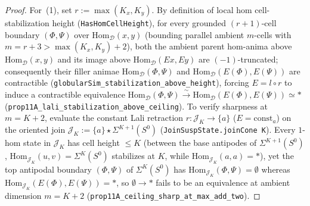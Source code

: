 \documentclass[10pt,twoside,openright]{book}
\theoremstyle{crmplain}
\theoremstyle{crmdef}
\theoremstyle{crmremark}
\begin{document}
\begin{proof}
For~(1), set $r := \max(K_x, K_y)$. By definition of local hom cell-stabilization height (\texttt{HasHomCellHeight}), for every grounded $(r+1)$-cell boundary $(\Phi, \Psi)$ over $\mathrm{Hom}_{\mathcal{D}}(x, y)$ (bounding parallel ambient $m$-cells with $m = r + 3 > \max(K_x, K_y) + 2$), both the ambient parent hom-anima above $\mathrm{Hom}_{\mathcal{D}}(x, y)$ and its image above $\mathrm{Hom}_{\mathcal{D}}(E x, E y)$ are $(-1)$-truncated; consequently their filler animae $\mathrm{Hom}_{\mathcal{D}}(\Phi, \Psi)$ and $\mathrm{Hom}_{\mathcal{D}}(E(\Phi), E(\Psi))$ are contractible (\texttt{globularSim\_\allowbreak stabilization\_\allowbreak above\_\allowbreak height}), forcing $E = l \circ r$ to induce a contractible equivalence $\mathrm{Hom}_{\mathcal{D}}(\Phi, \Psi) \xrightarrow{\sim} \mathrm{Hom}_{\mathcal{D}}(E(\Phi), E(\Psi)) \simeq *$ (\texttt{prop11A\_\allowbreak lali\_\allowbreak stabilization\_\allowbreak above\_\allowbreak ceiling}). To verify sharpness at $m = K + 2$, evaluate the constant Lali retraction $r : \mathcal{J}_K \to \{a\}$ ($E = \mathrm{const}_a$) on the oriented join $\mathcal{J}_K := \{a\} \star \Sigma^{K+1}(S^0)$ (\texttt{JoinSuspState.joinCone K}). Every $1$-hom state in $\mathcal{J}_K$ has cell height $\le K$ (between the base antipodes of $\Sigma^{K+1}(S^0)$, $\mathrm{Hom}_{\mathcal{J}_K}(u, v) = \Sigma^K(S^0)$ stabilizes at $K$, while $\mathrm{Hom}_{\mathcal{J}_K}(a, a) = *$), yet the top antipodal boundary $(\Phi, \Psi)$ of $\Sigma^K(S^0)$ has $\mathrm{Hom}_{\mathcal{J}_K}(\Phi, \Psi) = \emptyset$ whereas $\mathrm{Hom}_{\mathcal{J}_K}(E(\Phi), E(\Psi)) = *$, so $\emptyset \to *$ fails to be an equivalence at ambient dimension $m = K + 2$ (\texttt{prop11A\_\allowbreak ceiling\_\allowbreak sharp\_\allowbreak at\_\allowbreak max\_\allowbreak add\_\allowbreak two}).


\end{proof}
\end{document}
